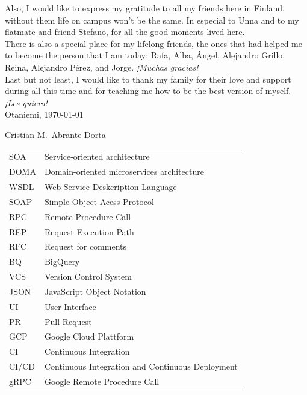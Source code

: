 \documentclass[english, 12pt, a4paper, sci, utf8, a-1b, online]{aaltothesis}
\begin{document}
Also, I would like to express my gratitude to all my friends here in Finland, without them life on campus won't be the same. In especial to Unna and to my flatmate and friend Stefano, for all the good moments lived here.\\

There is also a special place for my lifelong friends, the ones that had helped me to become the person that I am today: Rafa, Alba, Ángel, Alejandro Grillo, Reina, Alejandro Pérez, and Jorge. \textit{¡Muchas gracias!}\\

Last but not least, I would like to thank my family for their love and support during all this time and for teaching me how to be the best version of myself. \textit{¡Les quiero!}\\

\vspace{5cm}
Otaniemi, \today

\vspace{5mm}
{\hfill Cristian M.\ Abrante Dorta \hspace{1cm}}

\newpage


\thesistableofcontents



\begin{tabular}{ll}
SOA          & Service-oriented architecture \\
DOMA         & Domain-oriented microservices architecture \\
WSDL         & Web Service Deskcription Language \\
SOAP         & Simple Object Acess Protocol \\
RPC          & Remote Procedure Call \\
REP          & Request Execution Path \\
RFC          & Request for comments \\
BQ           & BigQuery \\
VCS          & Version Control System\\
JSON         & JavaScript Object Notation\\
UI           & User Interface\\
PR           & Pull Request\\
GCP          & Google Cloud Plattform\\
CI           & Continuous Integration\\
CI/CD        & Continuous Integration and Continuous Deployment\\
gRPC         & Google Remote Procedure Call\\

\end{tabular}
\end{document}
